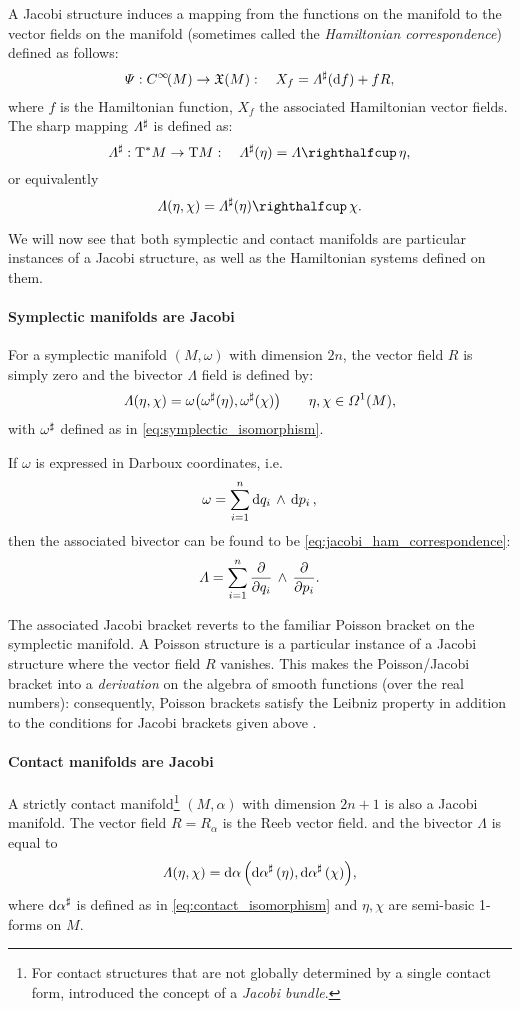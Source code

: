 A Jacobi structure induces a mapping from the functions on the manifold to the vector fields on the manifold (sometimes called the \emph{Hamiltonian correspondence}) \cite{ciaglia2018,mahmood2012} defined as follows:
\begin{equation} 
    \Psi: C^\infty\!\qty(M) \to \mathfrak{X}\qty(M): \quad X_f = \Lambda^\sharp(\dd{f}) + f R,
    \label{eq:jacobi_ham_correspondence}
\end{equation}
where $f$ is the Hamiltonian function, $X_f$ the associated Hamiltonian vector fields. The sharp mapping $\Lambda^\sharp$ is defined as:
$$ \fromDual{\Lambda}: \ctbundle{M} \to \tbundle{M}: \quad \fromDual{\Lambda}(\eta) = \intpr{\Lambda}{\eta}, $$
or equivalently
$$ \Lambda(\eta, \chi)  = \intpr{\fromDual{\Lambda}(\eta)}{\chi}. $$

We will now see that both symplectic and contact manifolds are particular instances of a Jacobi structure, as well as the Hamiltonian systems defined on them.

\paragraph{Symplectic manifolds are Jacobi}
For a symplectic manifold $(M, \omega)$ with dimension $2n$, the vector field $R$ is simply zero and the bivector $\Lambda$ field is defined by:
$$ \Lambda(\eta, \chi) = \omega\qty(\omega^\sharp(\eta), \omega^\sharp(\chi)) \qquad \eta, \chi \in \Omega^{1}(M), $$
with $\omega^\sharp$ defined as in \cref{eq:symplectic_isomorphism}. 

If $\omega$ is expressed in Darboux coordinates, i.e.
$$ \omega = \sum^n_{i = 1}  \dd{q_i}\,\wedge\,\dd{p_i} ,$$
then the associated bivector can be found to be \cref{eq:jacobi_ham_correspondence}:
$$ \Lambda = \sum^n_{i = 1}  \pdv{}{q_i}\,\wedge\,\pdv{}{p_i} . $$

The associated Jacobi bracket reverts to the familiar Poisson bracket on the symplectic manifold. A Poisson structure is a particular instance of a Jacobi structure where the vector field $R$ vanishes. This makes the Poisson/Jacobi bracket into a \emph{derivation} on the algebra of smooth functions (over the real numbers): consequently, Poisson brackets satisfy the Leibniz property in addition to the conditions for Jacobi brackets given above \cite{marle1991}.

\paragraph{Contact manifolds are Jacobi}
A strictly contact manifold\footnote{For contact structures that are not globally determined by a single contact form, \citet{marle1991} introduced the concept of a \emph{Jacobi bundle}.} $(M, \alpha)$ with dimension $2n + 1$ is also a Jacobi manifold. The vector field $R = R_\alpha$ is the Reeb vector field. 
and the bivector $\Lambda$ is equal to
$$ \Lambda(\eta, \chi) = \dd{\alpha}\qty(\dd{\alpha}^\sharp(\eta), \dd{\alpha}^\sharp(\chi)), $$
where $\dd{\alpha}^\sharp$ is defined as in \cref{eq:contact_isomorphism} and $\eta,\chi$ are semi-basic 1-forms on $M$.

